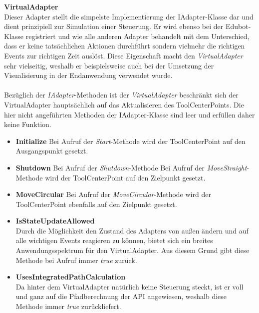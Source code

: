 \textbf{VirtualAdapter}\\
Dieser Adapter stellt die simpelste Implementierung der IAdapter-Klasse dar und dient prinzipiell zur Simulation einer Steuerung. Er wird ebenso bei der Edubot-Klasse registriert und wie alle anderen Adapter behandelt mit dem Unterschied, dass er keine tatsächlichen Aktionen durchführt sondern vielmehr die richtigen Events zur richtigen Zeit auslöst. Diese Eigenschaft macht den \textit{VirtualAdapter} sehr vielseitig, weshalb er beispielsweise auch bei der Umsetzung der Visualisierung in der Endanwendung verwendet wurde.\\
\\
Bezüglich der \textit{IAdapter}-Methoden ist der \textit{VirtualAdapter} beschränkt sich der VirtualAdapter hauptsächlich auf das Aktualisieren des ToolCenterPoints. Die hier nicht angeführten Methoden der IAdapter-Klasse sind leer und erfüllen daher keine Funktion.
\begin{itemize}
\item \textbf{Initialize}
\newline
Bei Aufruf der \textit{Start}-Methode wird der ToolCenterPoint auf den Ausgangspunkt gesetzt.
\item \textbf{Shutdown}
\newline
Bei Aufruf der \textit{Shutdown}-Methode 
\newline
Bei Aufruf der \textit{MoveStraight}-Methode wird der ToolCenterPoint auf den Zielpunkt gesetzt.
\item \textbf{MoveCircular}
\newline
Bei Aufruf der \textit{MoveCircular}-Methode wird der ToolCenterPoint ebenfalls auf den Zielpunkt gesetzt.
\newline
\item \textbf{IsStateUpdateAllowed}\\
Durch die Möglichkeit den Zustand des Adapters von außen ändern und auf alle wichtigen Events reagieren zu können, bietet sich ein breites Anwendungsspektrum für den VirtualAdapter. Aus diesem Grund gibt diese Methode bei Aufruf immer \textit{true} zurück.
\item \textbf{UsesIntegratedPathCalculation}\\
Da hinter dem VirtualAdapter natürlich keine Steuerung steckt, ist er voll und ganz auf die Pfadberechnung der API angewiesen, weshalb diese Methode immer \textit{true} zurückliefert.
\end{itemize}


